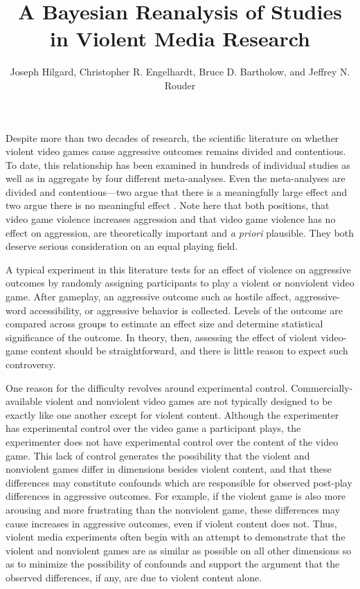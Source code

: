 \documentclass[man]{apa6}
\author{Joseph Hilgard, Christopher R. Engelhardt, Bruce D. Bartholow, and Jeffrey N. Rouder}
\title{A Bayesian Reanalysis of Studies in Violent Media Research}
\affiliation{University of Missouri}
\begin{document}
\maketitle

Despite more than two decades of research, the scientific literature on whether violent video games cause aggressive outcomes remains divided and contentious. To date, this relationship has been examined in hundreds of individual studies as well as in aggregate by four different meta-analyses. Even the meta-analyses are divided and contentious---two argue that there is a meaningfully large effect \citep{Anderson:etal:2010,Greitemeyer:Mugge:2014} and two argue there is no meaningful effect \citep[e.g.,][]{Ferguson:Kilburn:2009,Sherry:2001}. Note here that both positions, that video game violence increases aggression and that video game violence has no effect on aggression, are theoretically important and {\em a priori} plausible.  They both deserve serious consideration on an equal playing field. 

A typical experiment in this literature tests for an effect of violence on aggressive outcomes by randomly assigning participants to play a violent or nonviolent video game. After gameplay, an aggressive outcome such as hostile affect, aggressive-word accessibility, or aggressive behavior is collected. Levels of the outcome are compared across groups to estimate an effect size and determine statistical significance of the outcome.  In theory, then, assessing the effect of violent video-game content should be straightforward, and there is little reason to expect such controversy.

One reason for the difficulty revolves around experimental control.  Commercially-available violent and nonviolent video games are not typically designed to be exactly like one another except for violent content. Although the experimenter has experimental control over the video game a participant plays, the experimenter does not have experimental control over the content of the video game. This lack of control generates the possibility that the violent and nonviolent games differ in dimensions besides violent content, and that these differences may constitute confounds which are responsible for observed post-play differences in aggressive outcomes. For example, if the violent game is also more arousing and more frustrating than the nonviolent game, these differences may cause increases in aggressive outcomes, even if violent content does not.   Thus, violent media experiments often begin with an attempt to demonstrate that the violent and nonviolent games are as similar as possible on all other dimensions so as to minimize the possibility of confounds and support the argument that the observed differences, if any, are due to violent content alone.
\end{document}
